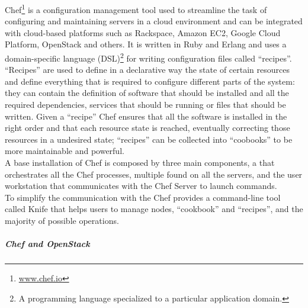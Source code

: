 Chef\footnote{\url{www.chef.io}} is a configuration management tool used to streamline the task of configuring and maintaining servers in a cloud environment and can be integrated with cloud-based platforms such as Rackspace, Amazon EC2, Google Cloud Platform, OpenStack and others. It is written in Ruby and Erlang and uses a domain-specific language (DSL)\footnote{A programming language specialized to a particular application domain.} for writing configuration files called ``recipes''. ``Recipes'' are used to define in a declarative way the state of certain resources and define everything that is required to configure different parts of the system: they can contain the definition of software that should be installed and all the required dependencies, services that should be running or files that should be written. Given a ``recipe'' Chef ensures that all the software is installed in the right order and that each resource state is reached, eventually correcting those resources in a undesired state; ``recipes'' can be collected into ``coobooks'' to be more maintainable and powerful.\\
A base installation of Chef is composed by three main components, a  that orchestrates all the Chef processes, multiple  found on all the servers, and the user workstation that communicates with the Chef Server to launch commands.\\
To simplify the communication with the  Chef provides a command-line tool called Knife that helps users to manage nodes, ``cookbook'' and ``recipes'', and the majority of possible operations.

\subparagraph{Chef and OpenStack}
\label{subp:sota_chef_openstack}

